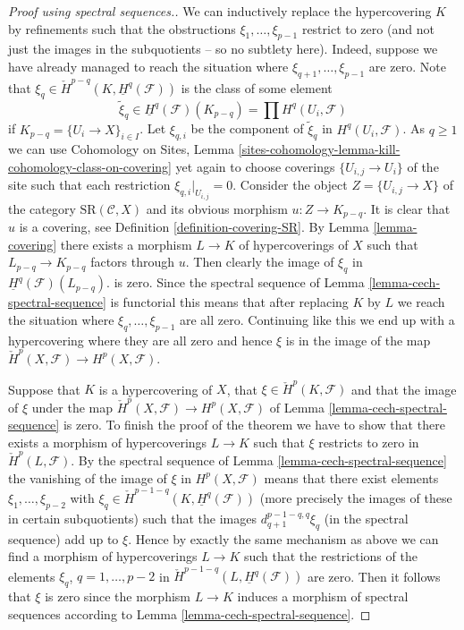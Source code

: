 \documentclass{stacks-project}
\theoremstyle{plain}
\theoremstyle{definition}
\theoremstyle{remark}
\numberwithin{equation}{subsection}
\begin{document}
\begin{proof}[Proof using spectral sequences.]
\medskip\noindent
We can inductively replace the hypercovering $K$ by refinements
such that the obstructions $\xi_1, \ldots, \xi_{p - 1}$ restrict to zero
(and not just the images
in the subquotients -- so no subtlety here). Indeed, suppose we have
already managed to reach the situation where
$\xi_{q + 1}, \ldots, \xi_{p - 1}$ are zero.
Note that $\xi_q \in \check{H}^{p - q}(K, \underline{H}^q(\mathcal{F}))$
is the class of some element
$$
\tilde \xi_q \in
\underline{H}^q(\mathcal{F})(K_{p - q}) =
\prod H^q(U_i, \mathcal{F})
$$
if $K_{p - q} = \{U_i \to X\}_{i \in I}$. Let $\xi_{q, i}$
be the component of $\tilde \xi_q$ in $H^q(U_i, \mathcal{F})$.
As $q \geq 1$ we can use
Cohomology on Sites,
Lemma \ref{sites-cohomology-lemma-kill-cohomology-class-on-covering}
yet again to choose coverings $\{U_{i, j} \to U_i\}$
of the site such that each restriction $\xi_{q, i}|_{U_{i, j}} = 0$.
Consider the object $Z = \{U_{i, j} \to X\}$ of the category
$\text{SR}(\mathcal{C}, X)$ and its obvious morphism
$u : Z \to K_{p - q}$. It is clear that $u$ is a covering, see
Definition \ref{definition-covering-SR}. By
Lemma \ref{lemma-covering} there
exists a morphism $L \to K$ of hypercoverings of $X$ such that
$L_{p - q} \to K_{p - q}$ factors through $u$. Then clearly the
image of $\xi_q$ in $\underline{H}^q(\mathcal{F})(L_{p - q})$.
is zero. Since the spectral sequence of
Lemma \ref{lemma-cech-spectral-sequence}
is functorial this means that after replacing $K$ by $L$ we reach the
situation where $\xi_q, \ldots, \xi_{p - 1}$ are all zero.
Continuing like this we end up with a hypercovering where they are all
zero and hence $\xi$ is in the image of the map
$\check{H}^p(X, \mathcal{F}) \to H^p(X, \mathcal{F})$.

\medskip\noindent
Suppose that $K$ is a hypercovering of $X$, that
$\xi \in \check{H}^p(K, \mathcal{F})$ and that the image of
$\xi$ under the map
$\check{H}^p(X, \mathcal{F}) \to H^p(X, \mathcal{F})$ of
Lemma \ref{lemma-cech-spectral-sequence}
is zero. To finish the proof of the theorem we have to show that
there exists a morphism of hypercoverings $L \to K$ such that
$\xi$ restricts to zero in $\check{H}^p(L, \mathcal{F})$.
By the spectral sequence of Lemma \ref{lemma-cech-spectral-sequence}
the vanishing of the image of $\xi$ in $H^p(X, \mathcal{F})$
means that there exist elements $\xi_1, \ldots, \xi_{p - 2}$
with $\xi_q \in \check{H}^{p - 1 - q}(K, \underline{H}^q(\mathcal{F}))$
(more precisely the images of these in certain subquotients)
such that the images $d_{q + 1}^{p - 1 - q, q}\xi_q$ (in the spectral
sequence) add up to $\xi$. Hence by exactly the same mechanism as above
we can find a morphism of hypercoverings $L \to K$ such that
the restrictions of the elements $\xi_q$, $q = 1, \ldots, p - 2$
in $\check{H}^{p - 1 - q}(L, \underline{H}^q(\mathcal{F}))$ are zero.
Then it follows that $\xi$ is zero since the morphism $L \to K$
induces a morphism of spectral sequences according to
Lemma \ref{lemma-cech-spectral-sequence}.
\end{proof}
\end{document}

